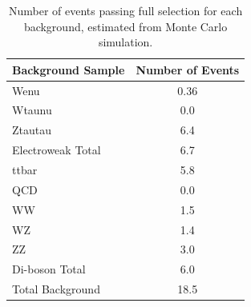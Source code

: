 \begin{table}[htbp]
  \begin{center}
    \caption{\fixspacing Number of events passing full selection 
      for each background, estimated from 
      Monte Carlo simulation.}
    \label{TableBackgroundMC}
    \begin{tabular}[]{ | l | c | }
      \hline
      Background Sample & Number of Events  \\ \hline \hline
      Wenu & 0.36 \\ \hline %
      Wtaunu & 0.0 \\ \hline %
      Ztautau & 6.4 \\ \hline %
      Electroweak Total & 6.7 \\ \hline \hline %
      ttbar & 5.8 \\ \hline \hline %
      QCD & 0.0 \\ \hline \hline %
      WW & 1.5 \\ \hline %
      WZ & 1.4 \\ \hline %
      ZZ & 3.0 \\ \hline %
      Di-boson Total & 6.0 \\ \hline \hline %
      Total Background & 18.5 \\ \hline %
    \end{tabular}
  \end{center}
\end{table}



